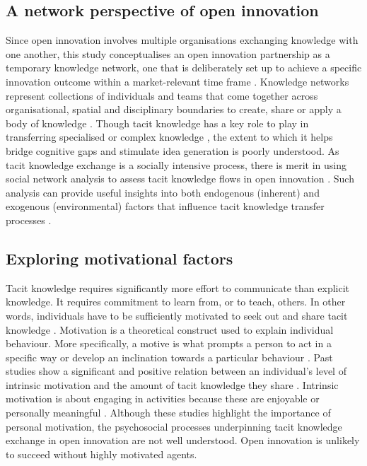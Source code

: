 \subsection{A network perspective of open innovation}

Since open innovation involves multiple organisations exchanging knowledge with one another, this study conceptualises an open innovation partnership as a temporary knowledge network, one that is deliberately set up to achieve a specific innovation outcome within a market-relevant time frame \citep{perez2013temporary,cococcioni2014exploring,terhorst2018tacit}. Knowledge networks represent collections of individuals and teams that come together across organisational, spatial and disciplinary boundaries to create, share or apply a body of knowledge \citep{pugh2013designing}. Though tacit knowledge has a key role to play in transferring specialised or complex knowledge \citep{davenport1998working,sternberg1999tacit,johnson2002all,endres2007tacit,tell2017managing}, the extent to which it helps bridge cognitive gaps and stimulate idea generation is poorly understood. As tacit knowledge exchange is a socially intensive process, there is merit in using social network analysis to assess tacit knowledge flows in open innovation \citep{leonard1998role,busch2000graphically,zhu2007social}. Such analysis can provide useful insights into both endogenous (inherent) and exogenous (environmental) factors that influence tacit knowledge transfer processes \citep{kolleck2013social,tortoriello2015social}. 

\subsection{Exploring motivational factors}

Tacit knowledge requires significantly more effort to communicate than explicit knowledge. It requires commitment to learn from, or to teach, others. In other words, individuals have to be sufficiently motivated to seek out and share tacit knowledge \citep{leonard1998role}. Motivation is a theoretical construct used to explain individual behaviour. More specifically, a motive is what prompts a person to act in a specific way or develop an inclination towards a particular behaviour \citep{pardee1990motivation}. Past studies show a significant and positive relation between an individual's level of intrinsic motivation and the amount of tacit knowledge they share \citep[e.g.][]{osterloh2000motivation,kaser2001knowledge,smith2001role}. Intrinsic motivation is about engaging in activities because these are enjoyable or personally meaningful \citep{ryan2000intrinsic}. Although these studies highlight the importance of personal motivation, the psychosocial processes underpinning tacit knowledge exchange in open innovation are not well understood. Open innovation is unlikely to succeed without highly motivated agents.

